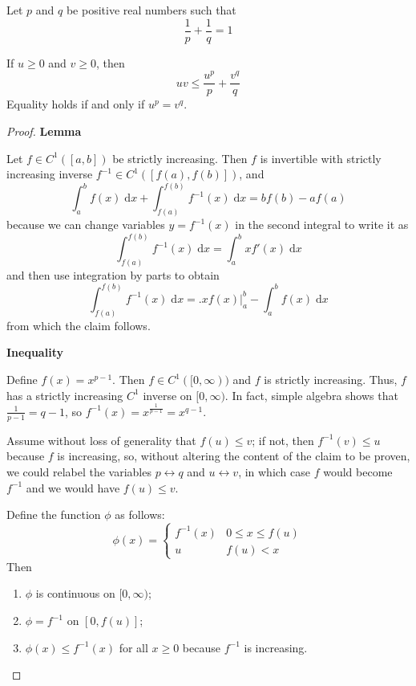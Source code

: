 \documentclass{homework}
\begin{document}
	
	Let $p$ and $q$ be positive real numbers such that
	$$
	\frac{1}{p} + \frac{1}{q} = 1
	$$
	
	\begin{alphaparts}
		
		\questionpart %
		
		If $u \ge 0$ and $v \ge0$, then
		$$
		uv \le \frac{u^p}{p} + \frac{v^q}{q}
		$$
		Equality holds if and only if $u^p = v^q$.
		
		\begin{proof}
			\textbf{Lemma}
			
			Let $f \in C^1([a,b])$ be strictly increasing. Then $f$ is invertible with strictly increasing inverse $f^{-1} \in C^1([f(a), f(b)])$, and
			$$
			\int_a^bf(x)\;\text{d}x + \int_{f(a)}^{f(b)}f^{-1}(x)\;\text{d}x = bf(b) - af(a)
			$$
			because we can change variables $y = f^{-1}(x)$ in the second integral to write it as
			$$
			\int_{f(a)}^{f(b)}f^{-1}(x)\;\text{d}x = \int_a^bxf'(x)\;\text{d}x
			$$
			and then use integration by parts to obtain
			$$
			\int_{f(a)}^{f(b)}f^{-1}(x)\;\text{d}x = \Big.xf(x)\Big|_a^b - \int_a^b f(x)\;\text{d}x
			$$
			from which the claim follows.
		
			\textbf{Inequality}
			
			Define $f(x) = x^{p-1}$. Then $f \in C^1([0,\infty))$ and $f$ is strictly increasing. Thus, $f$ has a strictly increasing $C^1$ inverse on $[0, \infty)$. In fact, simple algebra shows that $\frac{1}{p-1}=q-1$, so $f^{-1}(x) = x^\frac{1}{p-1} = x^{q-1}$. 
			
			Assume without loss of generality that $f(u) \le v$; if not, then $f^{-1}(v) \le u$ because $f$ is increasing, so, without altering the content of the claim to be proven, we could relabel the variables $p \leftrightarrow q$ and $u \leftrightarrow v$, in which case $f$ would become $f^{-1}$ and we would have $f(u) \le v$. 
			
			Define the function $\phi$ as follows:
			$$
			\phi(x) = \begin{cases}
				f^{-1}(x) & 0 \le x \le f(u)\\
				u & f(u) < x
			\end{cases}
			$$
			Then
			\begin{enumerate}
				\item $\phi$ is continuous on $[0, \infty)$;
				\item $\phi = f^{-1}$ on $[0, f(u)]$;
				\item $\phi(x) \le f^{-1}(x)$ for all $x \ge 0$ because $f^{-1}$ is increasing.
			\end{enumerate}
			

\end{proof}
\end{alphaparts}
\end{document}

